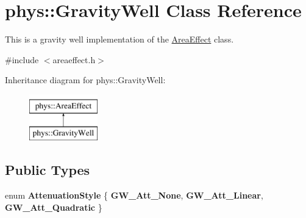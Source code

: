 \hypertarget{classphys_1_1GravityWell}{
\section{phys::GravityWell Class Reference}
\label{d6/d21/classphys_1_1GravityWell}
}


This is a gravity well implementation of the \hyperlink{classphys_1_1AreaEffect}{AreaEffect} class.  




{\ttfamily \#include $<$areaeffect.h$>$}

Inheritance diagram for phys::GravityWell:\begin{figure}[H]
\begin{center}
\leavevmode
\includegraphics[height=2.000000cm]{d6/d21/classphys_1_1GravityWell}
\end{center}
\end{figure}
\subsection*{Public Types}
\begin{DoxyCompactItemize}
\item 
enum {\bfseries AttenuationStyle} \{ {\bfseries GW\_\-Att\_\-None}, 
{\bfseries GW\_\-Att\_\-Linear}, 
{\bfseries GW\_\-Att\_\-Quadratic}
 \}
\end{DoxyCompactItemize}

